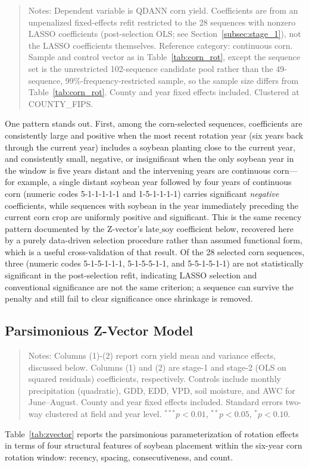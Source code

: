 \documentclass[12pt,letterpaper]{article}
\theoremstyle{remark}
\theoremstyle{remark}
\theoremstyle{plain}
\theoremstyle{definition}
\begin{document}

\begin{quote}
\small
Notes: Dependent variable is QDANN corn yield. Coefficients are from an unpenalized fixed-effects refit restricted to the 28 sequences with nonzero LASSO coefficients (post-selection OLS; see Section~\ref{subsec:stage_1}), not the LASSO coefficients themselves. Reference category: continuous corn. Sample and control vector as in Table~\ref{tab:corn_rot}, except the sequence set is the unrestricted 102-sequence candidate pool rather than the 49-sequence, 99\%-frequency-restricted sample, so the sample size differs from Table~\ref{tab:corn_rot}. County and year fixed effects included. Clustered at COUNTY\_FIPS. %
\end{quote}

One pattern stands out. First, among the corn-selected sequences, coefficients are consistently large and positive when the most recent rotation year (six years back through the current year) includes a soybean planting close to the current year, and consistently small, negative, or insignificant when the only soybean year in the window is five years distant and the intervening years are continuous corn---for example, a single distant soybean year followed by four years of continuous corn (numeric codes 5-1-1-1-1-1 and 1-5-1-1-1-1) carries significant \emph{negative} coefficients, while sequences with soybean in the year immediately preceding the current corn crop are uniformly positive and significant. This is the same recency pattern documented by the Z-vector's $\text{late\_soy}$ coefficient below, recovered here by a purely data-driven selection procedure rather than assumed functional form, which is a useful cross-validation of that result. Of the 28 selected corn sequences, three (numeric codes 5-1-5-1-1-1, 5-1-5-5-1-1, and 5-5-1-5-1-1) are not statistically significant in the post-selection refit, indicating LASSO selection and conventional significance are not the same criterion; a sequence can survive the penalty and still fail to clear significance once shrinkage is removed.

\subsection{Parsimonious Z-Vector Model}


\begin{quote}
\small
Notes: Columns (1)-(2) report corn yield mean and variance effects, discussed below. Columns (1) and (2) are stage-1 and stage-2 (OLS on squared residuals) coefficients, respectively. Controls include monthly precipitation (quadratic), GDD, EDD, VPD, soil moisture, and AWC for June--August. County and year fixed effects included. Standard errors two-way clustered at field and year level. $^{***}p<0.01$, $^{**}p<0.05$, $^{*}p<0.10$.
\end{quote}
Table~\ref{tab:zvector} reports the parsimonious parameterization of rotation effects in terms of four structural features of soybean placement within the six-year corn rotation window: recency, spacing, consecutiveness, and count.
\end{document}

